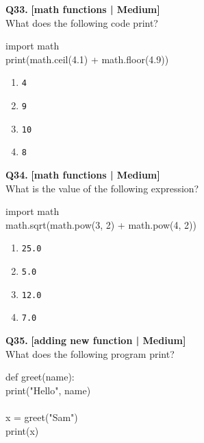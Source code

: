 \noindent\textbf{Q33.} \hfill {\small\color{LPUOrange}\textbf{[math functions | Medium]}}\\[2pt]
What does the following code print? 

\begin{pycode}
import math\\
print(math.ceil(4.1) + math.floor(4.9))
\end{pycode}

\begin{enumerate}[label=(\alph*),topsep=2pt,itemsep=1pt,partopsep=0pt,parsep=0pt]
    \item \relax \texttt{4}
    \item \relax \texttt{9}
    \item \relax \texttt{10}
    \item \relax \texttt{8}
\end{enumerate}
\vspace{2mm}

\noindent\textbf{Q34.} \hfill {\small\color{LPUOrange}\textbf{[math functions | Medium]}}\\[2pt]
What is the value of the following expression? 

\begin{pycode}
import math\\
math.sqrt(math.pow(3, 2) + math.pow(4, 2))
\end{pycode}

\begin{enumerate}[label=(\alph*),topsep=2pt,itemsep=1pt,partopsep=0pt,parsep=0pt]
    \item \relax \texttt{25.0}
    \item \relax \texttt{5.0}
    \item \relax \texttt{12.0}
    \item \relax \texttt{7.0}
\end{enumerate}
\vspace{2mm}

\noindent\textbf{Q35.} \hfill {\small\color{LPUOrange}\textbf{[adding new function | Medium]}}\\[2pt]
What does the following program print? 

\begin{pycode}
def greet(name):\\
print("Hello", name)\\
~\\
x = greet("Sam")\\
print(x)
\end{pycode}

